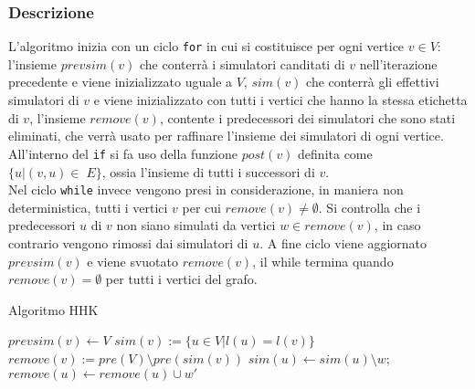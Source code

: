 \documentclass[12pt,a4paper,openright,twoside]{report}
\theoremstyle{definition}
\begin{document}
\subsubsection{Descrizione}
L'algoritmo inizia con un ciclo \texttt{for} in cui si costituisce per ogni vertice $v \in V$: l'insieme $prevsim(v)$ che conterrà i simulatori canditati di $v$ nell'iterazione precedente e viene inizializzato uguale a $V$, $sim(v)$ che conterrà gli effettivi simulatori di $v$ e viene inizializzato con tutti i vertici che hanno la stessa etichetta di $v$, l'insieme $remove(v)$, contente i predecessori dei simulatori che sono stati eliminati, che verrà usato per raffinare l'insieme dei simulatori di ogni vertice.\\
All'interno del \texttt{if} si fa uso della funzione $post(v)$ definita come $\{u|(v,u)\in\;E\}$, ossia l'insieme di tutti i successori di $v$.\\
Nel ciclo \texttt{while} invece vengono presi in considerazione, in maniera non deterministica, tutti i vertici $v$ per cui $remove(v)\not=\emptyset$. Si controlla che i predecessori $u$ di $v$ non siano simulati da vertici $w \in remove(v)$, in caso contrario vengono rimossi dai simulatori di $u$. A fine ciclo viene aggiornato $prevsim(v)$ e viene svuotato $remove(v)$, il while termina quando $remove(v)=\emptyset$ per tutti i vertici del grafo.
\begin{algorithm}
\caption{Algoritmo HHK}
\begin{algorithmic}[1]
  \State $prevsim(v) \gets V$
    $sim(v) := \{u \in V|l(u)=l(v)\}$  
  \EndIf
  \State$remove(v):=pre(V)\setminus pre(sim(v))$
\EndFor
{}
        $sim(u)\gets sim(u)\setminus {w};$
            $remove(u)\gets remove(u)\cup{w'}$
          \EndIf
        \EndFor
      \EndIf
    \EndFor  
  \EndFor
\EndWhile
\end{algorithmic}
\end{algorithm}
\end{document}

